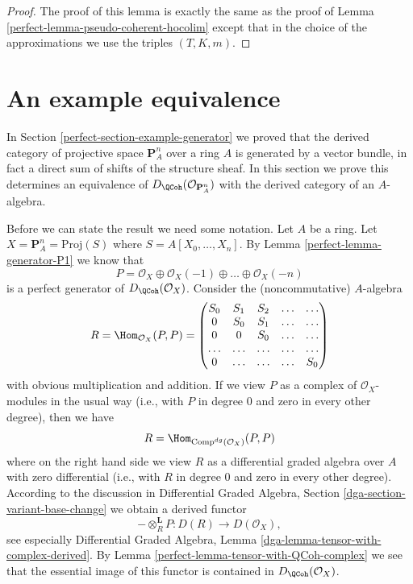 \begin{proof}

The proof of this lemma is exactly the same as the proof of
Lemma \ref{perfect-lemma-pseudo-coherent-hocolim}
except that in the choice of the approximations we use
the triples $(T, K, m)$.
\end{proof}

\section{An example equivalence}
\label{perfect-section-example-equivalence}
In Section \ref{perfect-section-example-generator}
we proved that the derived category of projective space $\mathbf{P}^n_A$
over a ring $A$ is generated by a vector bundle, in fact a direct
sum of shifts of the structure sheaf. In this section we prove this
determines an equivalence of $D_\QCoh(\mathcal{O}_{\mathbf{P}^n_A})$
with the derived category of an $A$-algebra.

\medskip\noindent
Before we can state the result we need some notation.
Let $A$ be a ring. Let $X = \mathbf{P}^n_A = \text{Proj}(S)$
where $S = A[X_0, \ldots, X_n]$. By Lemma \ref{perfect-lemma-generator-P1}
we know that
\begin{equation}
\label{equation-generator-Pn}
P =
\mathcal{O}_X \oplus \mathcal{O}_X(-1) \oplus \ldots \oplus \mathcal{O}_X(-n)
\end{equation}
is a perfect generator of $D_\QCoh(\mathcal{O}_X)$.
Consider the (noncommutative) $A$-algebra
\begin{equation}
\label{equation-algebra-for-Pn}
R = \Hom_{\mathcal{O}_X}(P, P) =
\left(
\begin{matrix}
S_0 & S_1 & S_2 & \ldots & \ldots \\
0 & S_0 & S_1 & \ldots & \ldots\\
0 & 0 & S_0 & \ldots & \ldots \\
\ldots & \ldots & \ldots & \ldots & \ldots \\
0 & \ldots & \ldots & \ldots & S_0
\end{matrix}
\right)
\end{equation}
with obvious multiplication and addition. If we view $P$ as a complex
of $\mathcal{O}_X$-modules in the usual way (i.e., with $P$ in degree $0$
and zero in every other degree), then we have
$$
R = \Hom_{\text{Comp}^{dg}(\mathcal{O}_X)}(P, P)
$$
where on the right hand side we view $R$ as a differential graded algebra
over $A$
with zero differential (i.e., with $R$ in degree $0$ and zero in every
other degree). According to the discussion in
Differential Graded Algebra, Section \ref{dga-section-variant-base-change}
we obtain a derived functor
$$
- \otimes_R^\mathbf{L} P : D(R) \longrightarrow D(\mathcal{O}_X),
$$
see especially Differential Graded Algebra, Lemma
\ref{dga-lemma-tensor-with-complex-derived}.
By Lemma \ref{perfect-lemma-tensor-with-QCoh-complex}
we see that the essential image of this functor
is contained in $D_\QCoh(\mathcal{O}_X)$.

